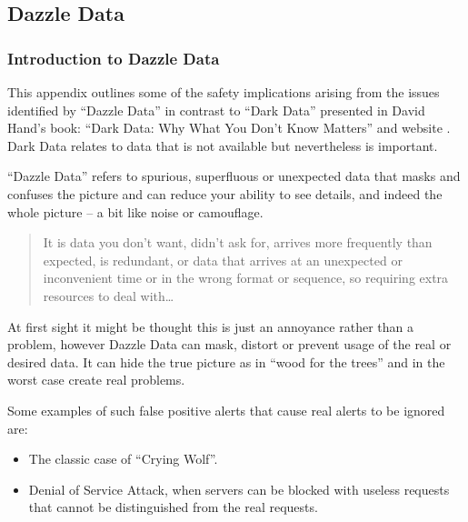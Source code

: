 \subsection{Dazzle Data} \label{bkm:dazzledata}
%



\subsubsection{Introduction to Dazzle Data}
This appendix outlines some of the safety implications arising from the issues identified by
``Dazzle Data'' in contrast to ``Dark Data'' presented in David Hand's book:
``Dark Data: Why What You Don't Know Matters'' \cite{citation:darkdata:hand}
and website \cite{citation:darkdata:website}.
Dark Data relates to data that is not available but nevertheless is important.

``Dazzle Data'' refers to spurious, superfluous or unexpected data that masks and confuses the picture and can reduce your ability to see details, and indeed the whole picture -- a bit like noise or camouflage.

\begin{quote}
  It is data you don't want, didn't ask for, arrives more frequently than expected, is redundant, or data that arrives at an unexpected or inconvenient time or in the wrong format or sequence, so requiring extra resources to deal with\dots
\end{quote}

At first sight it might be thought this is just an annoyance rather than a problem,
however Dazzle Data can mask, distort or prevent usage of the real or desired data.
It can hide the true picture as in ``wood for the trees'' and in the worst case create real problems. 

Some examples of such false positive alerts that cause real alerts to be ignored are:
\begin{itemize}
  \item The classic case of ``Crying Wolf''.
  \item Denial of Service Attack, when servers can be blocked with useless requests that cannot be distinguished from the real requests.
\end{itemize}

